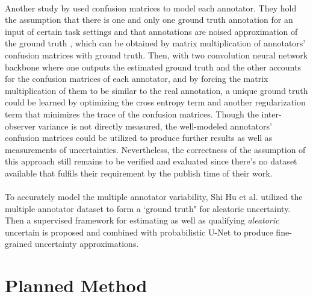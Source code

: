 \documentclass[12pt]{extarticle}
\begin{document}
\paragraph{}
Another study by \cite{zhang2020disentangling} used confusion matrices to
model each annotator. They hold the assumption that there is one and
only one ground truth annotation for an input of certain task settings and
that annotations are noised approximation of the ground truth
, which can be obtained by matrix multiplication of annotators' 
confusion matrices with ground truth. Then, with two convolution neural network backbone
where one outputs the estimated ground truth and the other accounts for the confusion matrices
of each annotator, and by forcing the matrix multiplication of them to be similar to the
real annotation, a unique ground truth could be learned by optimizing the cross entropy term
and another regularization term that minimizes the trace of the confusion matrices.
Though the inter-observer variance is not directly measured, the well-modeled annotators'
confusion matrices could be utilized to produce further results
as well as measurements of uncertainties.
Nevertheless, the correctness of the assumption of this approach
still remains to be verified and evaluated since there's no dataset available 
that fulfils their requirement by the publish time of their work.
\paragraph{}
To accurately model the multiple annotator variability, Shi Hu et al.\cite{hu2019supervised} utilized the multiple annotator dataset
to form a `ground truth" for aleatoric uncertainty. Then a supervised framework for estimating
as well as qualifying \textit{aleatoric} uncertain is proposed and combined with probabilistic U-Net
to produce fine-grained uncertainty approximations. 

\section{Planned Method}
\end{document}
